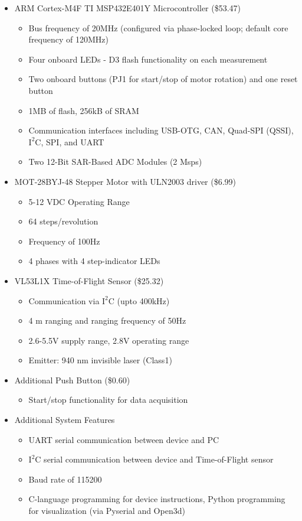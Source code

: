 \documentclass[12pt, letterpaper]{article}
\begin{document}
\begin{multicols}{2}
\begin{itemize}
\item ARM Cortex-M4F TI MSP432E401Y Microcontroller (\$53.47)
    \begin{itemize}
        \item Bus frequency of 20MHz (configured via phase-locked loop; default core frequency of 120MHz)
        \item Four onboard LEDs - D3 flash functionality on each measurement
        \item Two onboard buttons (PJ1 for start/stop of motor rotation) and one reset button
        \item 1MB of flash, 256kB of SRAM
        \item  Communication interfaces including USB-OTG, CAN, Quad-SPI (QSSI), $\mathrm{I^2C}$, SPI,  and UART
        \item Two 12-Bit SAR-Based ADC Modules (2 Msps)
    \end{itemize}
\item MOT-28BYJ-48 Stepper Motor with ULN2003 driver (\$6.99)
    \begin{itemize}
        \item 5-12 VDC Operating Range 
        \item 64 steps/revolution 
        \item Frequency of 100Hz
        \item 4 phases with 4 step-indicator LEDs
    \end{itemize}
\item VL53L1X Time-of-Flight Sensor (\$25.32)
    \begin{itemize}
        \item Communication via $\mathrm{I^2C}$ (upto 400kHz)
        \item 4 m ranging and ranging frequency of 50Hz
        \item 2.6-5.5V supply range, 2.8V operating range
        \item Emitter: 940 nm invisible laser (Class1)
    \end{itemize}
\item Additional Push Button (\$0.60)
    \begin{itemize}
        \item Start/stop functionality for data acquisition
    \end{itemize}
\item Additional System Features
    \begin{itemize}
        \item UART serial communication between device and PC
        \item $\mathrm{I^2C}$ serial communication between device and Time-of-Flight sensor
        \item Baud rate of 115200
        \item C-language programming for device instructions, Python programming for visualization (via Pyserial and Open3d)
    \end{itemize}
\end{itemize}
\end{multicols}
\end{document}
